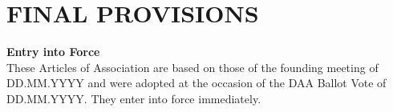 \section{FINAL PROVISIONS}

\item \textbf{Entry into Force} \\
These Articles of Association are based on those of the founding meeting of DD.MM.YYYY and were adopted at the occasion of the DAA Ballot Vote of DD.MM.YYYY.
They enter into force immediately.


